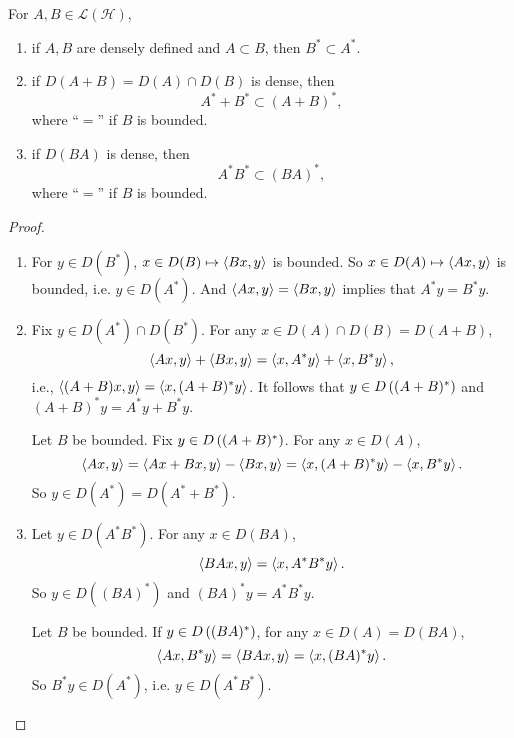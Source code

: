\documentclass[a4paper,12pt]{article}
\begin{document}
\begin{prop}
    For $A, B \in \mathcal{L}(\mathcal{H})$,
    \begin{enumerate}[label=(\arabic{*})]
        \item if $A,B$ are densely defined and $A \subset B$, then $B^* \subset A^*$.

        \item if $D(A+B) = D(A)\cap D(B)$ is dense, then
        \begin{equation*}
            A^* + B^* \subset (A+B)^*,
        \end{equation*}
        where ``$=$'' if $B$ is bounded.

        \item if $D(BA)$ is dense, then
        \begin{equation*}
            A^*B^* \subset (BA)^*,
        \end{equation*}
        where ``$=$'' if $B$ is bounded.
    \end{enumerate}
\end{prop}
\begin{proof}
    \begin{enumerate}[label=(\arabic{*})]
        \item For $y \in D(B^*)$, $x \in D(B) \mapsto \left\langle Bx,y \right\rangle$ is bounded. So $x \in D(A) \mapsto \left\langle Ax,y \right\rangle$ is bounded, i.e. $y \in D(A^*)$. And $\left\langle Ax,y \right\rangle = \left\langle Bx,y \right\rangle$ implies that $A^*y = B^*y$.

        \item Fix $y \in D(A^*)\cap D(B^*)$. For any $x \in D(A) \cap D(B) = D(A+B)$,
        \begin{equation*}
            \left\langle Ax,y \right\rangle + \left\langle Bx,y \right\rangle = \left\langle x,A^*y \right\rangle + \left\langle x,B^*y \right\rangle,
        \end{equation*}
        i.e., $\left\langle (A+B)x,y \right\rangle = \left\langle x,(A+B)^*y \right\rangle$. It follows that $y \in D\left((A+B)^*\right)$ and $(A+B)^*y = A^*y + B^*y$.

        Let $B$ be bounded. Fix $y \in D\left((A+B)^*\right)$. For any $x \in D(A)$,
        \begin{equation*}
            \left\langle Ax,y \right\rangle = \left\langle Ax + Bx,y \right\rangle - \left\langle Bx,y \right\rangle = \left\langle x,(A+B)^*y \right\rangle - \left\langle x,B^*y \right\rangle.
        \end{equation*}
        So $y \in D(A^*) = D(A^* + B^*)$.

        \item Let $y \in D(A^*B^*)$. For any $x \in D(BA)$,
        \begin{equation*}
            \left\langle BAx,y \right\rangle = \left\langle x,A^*B^*y \right\rangle.
        \end{equation*}
        So $y \in D((BA)^*)$ and $(BA)^*y = A^*B^*y$.

        Let $B$ be bounded. If $y \in D\left((BA)^*\right)$, for any $x \in D(A) = D(BA)$, 
        \begin{equation*}
            \left\langle Ax,B^*y \right\rangle = \left\langle BAx,y \right\rangle = \left\langle x,(BA)^*y \right\rangle.
        \end{equation*}
        So $B^*y \in D(A^*)$, i.e. $y \in D(A^*B^*)$.
    \end{enumerate}
\end{proof}
\end{document}

